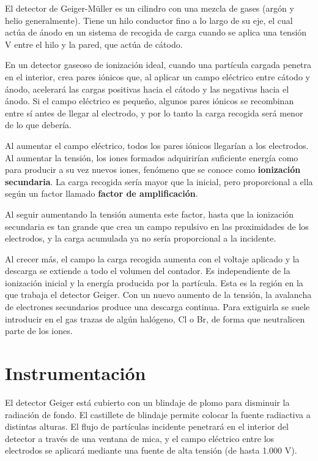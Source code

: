 \documentclass[a4paper,12pt,spanish]{article}
\begin{document}
	El detector de Geiger-Müller es un cilindro con una mezcla de gases (argón y helio generalmente). Tiene un hilo conductor fino a lo largo de su eje, el cual actúa de ánodo en un sistema de recogida de carga cuando se aplica una tensión V entre el hilo y la pared, que actúa de cátodo.
	
	
	
	
	
	
	En un detector gaseoso de ionización ideal, cuando una partícula cargada penetra en el interior, crea pares iónicos que, al aplicar un campo eléctrico entre cátodo y ánodo, acelerará las cargas positivas hacia el cátodo y las negativas hacia el ánodo. Si el campo	eléctrico es pequeño, algunos pares iónicos se recombinan entre sí antes de llegar al electrodo, y por lo tanto la carga recogida será menor de lo que debería. 
	
	Al aumentar el campo eléctrico, todos los pares iónicos llegarían a los electrodos.
	Al aumentar la tensión, los iones formados adquirirían suficiente energía como para producir a su vez nuevos iones, fenómeno que se conoce como \textbf{ionización secundaria}. La carga recogida sería mayor que la inicial, pero proporcional a ella según un factor llamado \textbf{factor de amplificación}.
	
	Al seguir aumentando la tensión aumenta este factor, hasta que la ionización secundaria es tan grande que crea un campo repulsivo en las proximidades de los
	electrodos, y la carga acumulada ya no sería proporcional a la incidente.
	
	Al crecer más, el campo la carga recogida aumenta con el voltaje aplicado y la descarga se extiende a todo el volumen del contador. Es independiente de la ionización inicial y la energía producida por la partícula. 
	Esta es la región en la que trabaja el detector Geiger. Con un nuevo aumento de la tensión, la avalancha de electrones secundarios produce una descarga continua. Para extiguirla se suele introducir en el gas trazas de algún halógeno, Cl o Br, de forma que neutralicen parte de los iones.
	
	
	
	
	\section{Instrumentación}
	
	El detector Geiger está cubierto con un blindaje de plomo para disminuir la	radiación de fondo. El castillete de blindaje permite colocar la fuente radiactiva a distintas alturas. El flujo de partículas incidente penetrará en el interior del detector a través de una ventana de mica, y el campo eléctrico entre los electrodos se aplicará mediante una fuente de alta tensión (de hasta 1.000 V).
	
\end{document}
